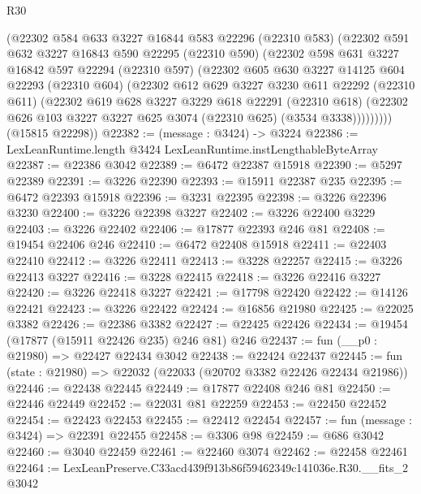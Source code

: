 \begin{lexlean}{R30}
\begin{coremodule}
        (@22302
          @584
          @633
          @3227
          @16844
          @583
          @22296
          (@22310 @583)
          (@22302
            @591
            @632
            @3227
            @16843
            @590
            @22295
            (@22310 @590)
            (@22302
              @598
              @631
              @3227
              @16842
              @597
              @22294
              (@22310 @597)
              (@22302
                @605
                @630
                @3227
                @14125
                @604
                @22293
                (@22310 @604)
                (@22302
                  @612
                  @629
                  @3227
                  @3230
                  @611
                  @22292
                  (@22310 @611)
                  (@22302
                    @619
                    @628
                    @3227
                    @3229
                    @618
                    @22291
                    (@22310 @618)
                    (@22302 @626 @103 @3227 @3227 @625 @3074 (@22310 @625) (@3534 @3338)))))))))
      (@15815 @22298))
@22382 := (message : @3424) -> @3224
@22386 := LexLeanRuntime.length @3424 LexLeanRuntime.instLengthableByteArray
@22387 := @22386 @3042
@22389 := @6472 @22387 @15918
@22390 := @5297 @22389
@22391 := @3226 @22390
@22393 := @15911 @22387 @235
@22395 := @6472 @22393 @15918
@22396 := @3231 @22395
@22398 := @3226 @22396 @3230
@22400 := @3226 @22398 @3227
@22402 := @3226 @22400 @3229
@22403 := @3226 @22402
@22406 := @17877 @22393 @246 @81
@22408 := @19454 @22406 @246
@22410 := @6472 @22408 @15918
@22411 := @22403 @22410
@22412 := @3226 @22411
@22413 := @3228 @22257
@22415 := @3226 @22413 @3227
@22416 := @3228 @22415
@22418 := @3226 @22416 @3227
@22420 := @3226 @22418 @3227
@22421 := @17798 @22420
@22422 := @14126 @22421
@22423 := @3226 @22422
@22424 := @16856 @21980
@22425 := @22025 @3382
@22426 := @22386 @3382
@22427 := @22425 @22426
@22434 := @19454 (@17877 (@15911 @22426 @235) @246 @81) @246
@22437 := fun (__p0 : @21980) => @22427 @22434 @3042
@22438 := @22424 @22437
@22445 := fun (state : @21980) => @22032 (@22033 (@20702 @3382 @22426 @22434 @21986))
@22446 := @22438 @22445
@22449 := @17877 @22408 @246 @81
@22450 := @22446 @22449
@22452 := @22031 @81 @22259
@22453 := @22450 @22452
@22454 := @22423 @22453
@22455 := @22412 @22454
@22457 := fun (message : @3424) => @22391 @22455
@22458 := @3306 @98
@22459 := @686 @3042
@22460 := @3040 @22459
@22461 := @22460 @3074
@22462 := @22458 @22461
@22464 := LexLeanPreserve.C33acd439f913b86f59462349c141036e.R30.__fits_2 @3042

\end{coremodule}
\end{lexlean}
